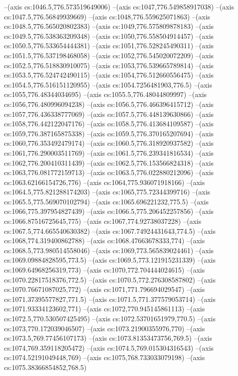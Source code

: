 --(axis cs:1046.5,776.573519649006)
--(axis cs:1047,776.549858917038)
--(axis cs:1047.5,776.56849939669)
--(axis cs:1048,776.559625071863)
--(axis cs:1048.5,776.565020802383)
--(axis cs:1049,776.575809878183)
--(axis cs:1049.5,776.538363209348)
--(axis cs:1050,776.558504914457)
--(axis cs:1050.5,776.533654444381)
--(axis cs:1051,776.528245490311)
--(axis cs:1051.5,776.537198468058)
--(axis cs:1052,776.545020072209)
--(axis cs:1052.5,776.518830910075)
--(axis cs:1053,776.539665789814)
--(axis cs:1053.5,776.524742490115)
--(axis cs:1054,776.512660556475)
--(axis cs:1054.5,776.516151120955)
--(axis cs:1054.7256481903,776.5)
--(axis cs:1055,776.48344034695)
--(axis cs:1055.5,776.48044809997)
--(axis cs:1056,776.480996094238)
--(axis cs:1056.5,776.466396415712)
--(axis cs:1057,776.436338777069)
--(axis cs:1057.5,776.448139630866)
--(axis cs:1058,776.442122047176)
--(axis cs:1058.5,776.413684109587)
--(axis cs:1059,776.387165875338)
--(axis cs:1059.5,776.370165207694)
--(axis cs:1060,776.353492479174)
--(axis cs:1060.5,776.318920937582)
--(axis cs:1061,776.290003511769)
--(axis cs:1061.5,776.239341816534)
--(axis cs:1062,776.200410311439)
--(axis cs:1062.5,776.153566824318)
--(axis cs:1063,776.081772159713)
--(axis cs:1063.5,776.022880212096)
--(axis cs:1063.62166154726,776)
--(axis cs:1064,775.936071918166)
--(axis cs:1064.5,775.821288174203)
--(axis cs:1065,775.72344399716)
--(axis cs:1065.5,775.569070102794)
--(axis cs:1065.696221232,775.5)
--(axis cs:1066,775.397954827439)
--(axis cs:1066.5,775.206452257856)
--(axis cs:1066.87516725645,775)
--(axis cs:1067,774.92738037228)
--(axis cs:1067.5,774.665540630382)
--(axis cs:1067.74924431643,774.5)
--(axis cs:1068,774.319400862788)
--(axis cs:1068.47663678333,774)
--(axis cs:1068.5,773.980514558046)
--(axis cs:1069,773.565839024461)
--(axis cs:1069.09884828595,773.5)
--(axis cs:1069.5,773.121915231339)
--(axis cs:1069.64968256319,773)
--(axis cs:1070,772.704444024615)
--(axis cs:1070.22817518376,772.5)
--(axis cs:1070.5,772.276308587802)
--(axis cs:1070.76671087025,772)
--(axis cs:1071,771.796694029547)
--(axis cs:1071.37395577827,771.5)
--(axis cs:1071.5,771.377579053714)
--(axis cs:1071.93334123602,771)
--(axis cs:1072,770.945145861113)
--(axis cs:1072.5,770.530507425495)
--(axis cs:1072.53701651979,770.5)
--(axis cs:1073,770.172039046507)
--(axis cs:1073.21900355976,770)
--(axis cs:1073.5,769.77456107173)
--(axis cs:1073.81353473756,769.5)
--(axis cs:1074,769.359118205472)
--(axis cs:1074.5,769.015304316543)
--(axis cs:1074.52191049448,769)
--(axis cs:1075,768.733033079198)
--(axis cs:1075.38366854852,768.5)
